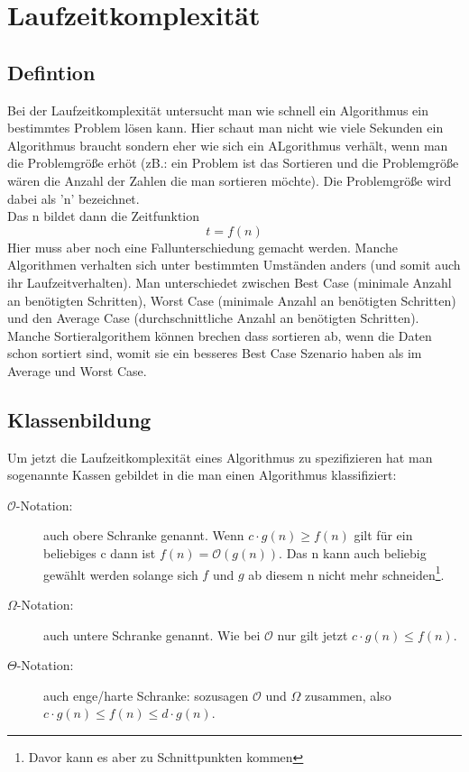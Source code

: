 \documentclass[a4paper]{scrartcl}
\begin{document}
    \section{Laufzeitkomplexität}
        \subsection{Defintion}
        Bei der Laufzeitkomplexität untersucht man wie schnell ein Algorithmus ein bestimmtes Problem lösen kann. Hier schaut man nicht wie viele Sekunden ein Algorithmus braucht sondern eher
        wie sich ein ALgorithmus verhält, wenn man die Problemgröße erhöt (zB.: ein Problem ist das Sortieren und die Problemgröße wären die Anzahl der Zahlen die man sortieren möchte).
        Die Problemgröße wird dabei als 'n' bezeichnet. \\
        Das n bildet dann die Zeitfunktion
        \begin{equation}
            t = f(n)
        \end{equation} 
        Hier muss aber noch eine Fallunterschiedung gemacht werden. Manche Algorithmen verhalten sich unter bestimmten Umständen anders (und somit auch ihr Laufzeitverhalten). Man unterschiedet 
        zwischen Best Case (minimale Anzahl an benötigten Schritten), Worst Case (minimale Anzahl an benötigten Schritten) und den Average Case (durchschnittliche Anzahl an benötigten Schritten).
        Manche Sortieralgorithem können brechen dass sortieren ab, wenn die Daten schon sortiert sind, womit sie ein besseres Best Case Szenario haben als im Average und Worst Case. 
        \subsection{Klassenbildung}
        Um jetzt die Laufzeitkomplexität eines Algorithmus zu spezifizieren hat man sogenannte Kassen gebildet in die man einen Algorithmus klassifiziert:
        \begin{description}
            \item[\(\mathcal{O}\)-Notation:] auch obere Schranke genannt. Wenn \( c \cdot g(n) \ge f(n) \) gilt für ein beliebiges c dann ist \(f(n) = \mathcal{O}(g(n))\). Das 
                n kann auch beliebig gewählt werden solange sich \(f\) und \(g\) ab diesem n nicht mehr schneiden\footnote{Davor kann es aber zu Schnittpunkten kommen}.
            \item[\(\Omega\)-Notation:] auch untere Schranke genannt. Wie bei \(\mathcal{O}\) nur gilt jetzt \( c \cdot g(n) \le f(n) \).
            \item[\(\Theta\)-Notation:] auch enge/harte Schranke: sozusagen \(\mathcal{O}\) und \(\Omega\) zusammen, also   \( c \cdot g(n) \le f(n) \le d \cdot g(n) \).  
        \end{description}
\end{document}
